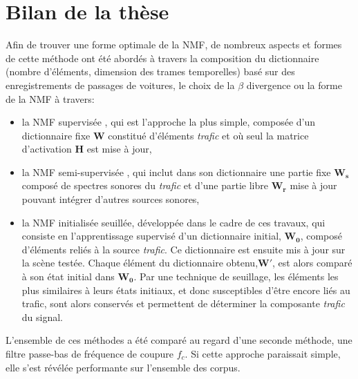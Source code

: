 \section*{Bilan de la thèse}
Afin de trouver une forme optimale de la NMF, de nombreux aspects et formes de cette méthode ont été abordés  à travers la composition du dictionnaire (nombre d'éléments, dimension des trames temporelles) basé sur des enregistrements de passages de voitures, le choix de la $\beta$ divergence ou la forme de la NMF à travers: 
\begin{itemize}
\item la NMF supervisée \cite{lee_learning_1999,fevotte_algorithms_2011}, qui est l'approche la plus simple, composée d'un dictionnaire fixe $ \mathbf{W}$ constitué d'éléments \textit{trafic} et où seul la matrice d'activation $\mathbf{H}$ est mise à jour, 
\item la NMF semi-supervisée \cite{lee_semi-supervised_2010,kitamura2014music}, qui inclut dans son  dictionnaire une partie fixe $\mathbf{W_s}$ composé de spectres sonores du \textit{trafic} et d'une partie libre $\mathbf{W_r}$ mise à jour pouvant intégrer d'autres sources sonores,
\item la NMF initialisée seuillée, développée dans le cadre de ces travaux, qui consiste en l'apprentissage supervisé d'un dictionnaire initial, $\mathbf{W_0}$, composé d'éléments reliés à la source \textit{trafic}. Ce dictionnaire est ensuite mis à jour sur la scène testée. Chaque élément du dictionnaire obtenu,$\mathbf{W'}$, est alors comparé à son état initial dans $\mathbf{W_0}$. Par une technique de seuillage, les éléments les plus similaires à leurs états initiaux, et donc susceptibles d'être encore liés au trafic, sont alors conservés et permettent de déterminer la composante \textit{trafic} du signal.
\end{itemize} 

L'ensemble de ces méthodes a été comparé au regard d'une seconde méthode, une filtre passe-bas de fréquence de coupure $f_c$. Si cette approche paraissait simple, elle s'est révélée performante sur l'ensemble des corpus.\\

